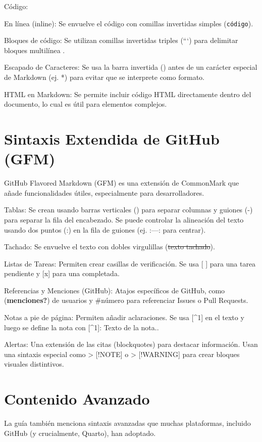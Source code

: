 \documentclass[
  letterpaper,
  DIV=11,
  numbers=noendperiod]{scrreprt}
\begin{document}
Código:

En línea (inline): Se envuelve el código con comillas invertidas simples
(\texttt{código}).

Bloques de código: Se utilizan comillas invertidas triples (```) para
delimitar bloques multilínea .

Escapado de Caracteres: Se usa la barra invertida () antes de un
carácter especial de Markdown (ej. *) para evitar que se interprete como
formato.

HTML en Markdown: Se permite incluir código HTML directamente dentro del
documento, lo cual es útil para elementos complejos.

\section{Sintaxis Extendida de GitHub
(GFM)}\label{sintaxis-extendida-de-github-gfm}

GitHub Flavored Markdown (GFM) es una extensión de CommonMark que añade
funcionalidades útiles, especialmente para desarrolladores.

Tablas: Se crean usando barras verticales (\textbar) para separar
columnas y guiones (-) para separar la fila del encabezado. Se puede
controlar la alineación del texto usando dos puntos (:) en la fila de
guiones (ej. :---: para centrar).

Tachado: Se envuelve el texto con dobles virgulillas (\st{texto
tachado}).

Listas de Tareas: Permiten crear casillas de verificación. Se usa {[}
{]} para una tarea pendiente y {[}x{]} para una completada.

Referencias y Menciones (GitHub): Atajos específicos de GitHub, como
(\textbf{menciones?}) de usuarios y \#número para referenciar Issues o
Pull Requests.

Notas a pie de página: Permiten añadir aclaraciones. Se usa {[}\^{}1{]}
en el texto y luego se define la nota con {[}\^{}1{]}: Texto de la
nota..

Alertas: Una extensión de las citas (blockquotes) para destacar
información. Usan una sintaxis especial como \textgreater{} {[}!NOTE{]}
o \textgreater{} {[}!WARNING{]} para crear bloques visuales distintivos.

\section{Contenido Avanzado}\label{contenido-avanzado}

La guía también menciona sintaxis avanzadas que muchas plataformas,
incluido GitHub (y crucialmente, Quarto), han adoptado.
\end{document}
